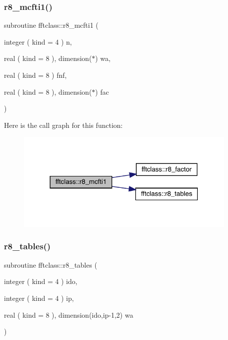 \subsubsection{\texorpdfstring{r8\_mcfti1()}{r8\_mcfti1()}}
{\footnotesize\ttfamily subroutine fftclass\+::r8\+\_\+mcfti1 (\begin{DoxyParamCaption}\item[{integer ( kind = 4 )}]{n,  }\item[{real ( kind = 8 ), dimension($\ast$)}]{wa,  }\item[{real ( kind = 8 )}]{fnf,  }\item[{real ( kind = 8 ), dimension($\ast$)}]{fac }\end{DoxyParamCaption})}

Here is the call graph for this function\+:\nopagebreak
\begin{figure}[H]
\begin{center}
\leavevmode
\includegraphics[width=303pt]{namespacefftclass_a89d64713ecbaec08b4d5180fcbc56cea_cgraph}
\end{center}
\end{figure}
\mbox{\label{namespacefftclass_a68ac2e6dba058989d5e0d7fbee9aa19f}} 
\subsubsection{\texorpdfstring{r8\_tables()}{r8\_tables()}}
{\footnotesize\ttfamily subroutine fftclass\+::r8\+\_\+tables (\begin{DoxyParamCaption}\item[{integer ( kind = 4 )}]{ido,  }\item[{integer ( kind = 4 )}]{ip,  }\item[{real ( kind = 8 ), dimension(ido,ip-\/1,2)}]{wa }\end{DoxyParamCaption})}


